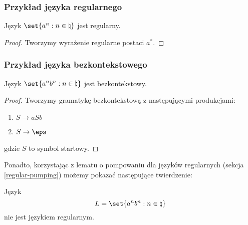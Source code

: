 \subsubsection{Przykład języka regularnego}

\begin{theorem}
	Język \( \set{a^n : n \in \natural} \) jest regularny.
\end{theorem}
\begin{proof}
	Tworzymy wyrażenie regularne postaci \(a^*\).
\end{proof}

\subsubsection{Przykład języka bezkontekstowego}
\label{cfl_example}

\begin{theorem}
	Język  \( \set{a^nb^n : n \in \natural} \) jest bezkontekstowy.
\end{theorem}
\begin{proof}
	Tworzymy gramatykę bezkontekstową z następującymi produkcjami: \begin{enumerate}
		\item \(S \rightarrow aSb \)
		\item \(S \rightarrow \eps \)
	\end{enumerate}
	gdzie \(S\) to symbol startowy.

\end{proof}

Ponadto, korzystając z lematu o pompowaniu dla języków regularnych (sekcja \ref{regular-pumping}) możemy pokazać następujące twierdzenie:

\begin{theorem}
	Język
	\[
		L = \set{a^nb^n : n \in \natural}
	\]
	nie jest językiem regularnym.
\end{theorem}

